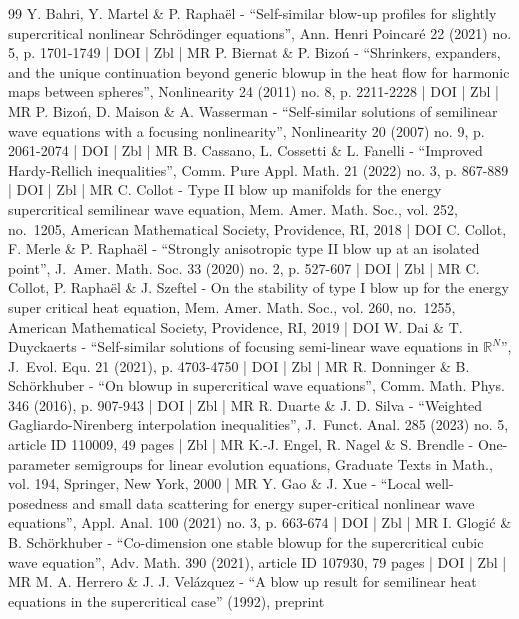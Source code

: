 \begin{thebibliography}{99}
Y. Bahri, Y. Martel \& P. Raphaël - “Self-similar blow-up profiles for slightly supercritical nonlinear Schrödinger equations”, Ann. Henri Poincaré 22 (2021) no. 5, p. 1701-1749 | DOI | Zbl | MR
P. Biernat \& P. Bizoń - “Shrinkers, expanders, and the unique continuation beyond generic blowup in the heat flow for harmonic maps between spheres”, Nonlinearity 24 (2011) no. 8, p. 2211-2228 | DOI | Zbl | MR
P. Bizoń, D. Maison \& A. Wasserman - “Self-similar solutions of semilinear wave equations with a focusing nonlinearity”, Nonlinearity 20 (2007) no. 9, p. 2061-2074 | DOI | Zbl | MR
B. Cassano, L. Cossetti \& L. Fanelli - “Improved Hardy-Rellich inequalities”, Comm. Pure Appl. Math. 21 (2022) no. 3, p. 867-889 | DOI | Zbl | MR
C. Collot - Type II blow up manifolds for the energy supercritical semilinear wave equation, Mem. Amer. Math. Soc., vol. 252, no. 1205, American Mathematical Society, Providence, RI, 2018 | DOI
C. Collot, F. Merle \& P. Raphaël - “Strongly anisotropic type II blow up at an isolated point”, J. Amer. Math. Soc. 33 (2020) no. 2, p. 527-607 | DOI | Zbl | MR
C. Collot, P. Raphaël \& J. Szeftel - On the stability of type I blow up for the energy super critical heat equation, Mem. Amer. Math. Soc., vol. 260, no. 1255, American Mathematical Society, Providence, RI, 2019 | DOI
W. Dai \& T. Duyckaerts - “Self-similar solutions of focusing semi-linear wave equations in $\mathbb{R}^N$”, J. Evol. Equ. 21 (2021), p. 4703-4750 | DOI | Zbl | MR
R. Donninger \& B. Schörkhuber - “On blowup in supercritical wave equations”, Comm. Math. Phys. 346 (2016), p. 907-943 | DOI | Zbl | MR
R. Duarte \& J. D. Silva - “Weighted Gagliardo-Nirenberg interpolation inequalities”, J. Funct. Anal. 285 (2023) no. 5, article ID 110009, 49 pages | Zbl | MR
K.-J. Engel, R. Nagel \& S. Brendle - One-parameter semigroups for linear evolution equations, Graduate Texts in Math., vol. 194, Springer, New York, 2000 | MR
Y. Gao \& J. Xue - “Local well-posedness and small data scattering for energy super-critical nonlinear wave equations”, Appl. Anal. 100 (2021) no. 3, p. 663-674 | DOI | Zbl | MR
I. Glogić \& B. Schörkhuber - “Co-dimension one stable blowup for the supercritical cubic wave equation”, Adv. Math. 390 (2021), article ID 107930, 79 pages | DOI | Zbl | MR
M. A. Herrero \& J. J. Velázquez - “A blow up result for semilinear heat equations in the supercritical case” (1992), preprint

\end{thebibliography}

